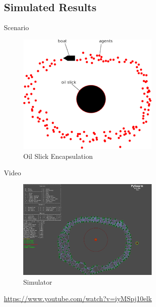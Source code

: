 \documentclass{beamer}
\begin{document}
\subsection{Simulated Results}
\begin{frame}{Scenario}
  \begin{center}
    \begin{figure}
      \begin{center}
        \includegraphics[width=7cm]{OilSlick.pdf}
      \end{center}
      \caption{Oil Slick Encapsulation}
    \end{figure}
  \end{center}
\end{frame}  

\begin{frame}{Video}
  \begin{center}
    \begin{figure}
      \begin{center}
        \includegraphics[width=7cm]{Simulator.pdf}
      \end{center}
      \caption{Simulator}
    \end{figure}
    \href{https://www.youtube.com/watch?v=iyMSpj10elk}{https://www.youtube.com/watch?v=iyMSpj10elk}
  \end{center}
\end{frame}  

\end{document}
